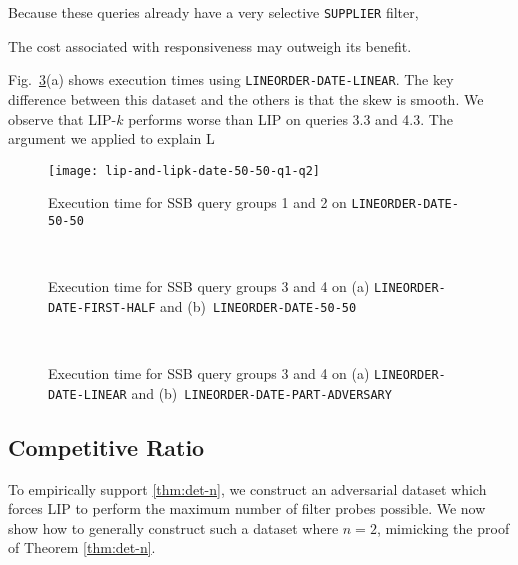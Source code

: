 Because these queries already have a very selective \texttt{SUPPLIER} filter, 

The cost associated with responsiveness may outweigh its benefit. 

Fig.~\ref{fig:times2}(a) shows execution times using \texttt{LINEORDER-DATE-LINEAR}. 
The key difference between this dataset and the others is that the skew is smooth. 
We observe that LIP-$k$ performs worse than LIP on queries 3.3 and 4.3. 
The argument we applied to explain L

\begin{figure}
    \centering
    \texttt{[image: lip-and-lipk-date-50-50-q1-q2]}
    \caption{Execution time for SSB query groups 1 and 2 on \texttt{LINEORDER-DATE-50-50}}
    \label{fig:times0}
\end{figure}

\begin{figure}
    \centering
    \\
    \caption{Execution time for SSB query groups 3 and 4 on (a) \texttt{LINEORDER-DATE-FIRST-HALF} and (b)~\texttt{LINEORDER-DATE-50-50}}
    \label{fig:times1}
\end{figure}


\begin{figure}
    \centering    
    \\
    \caption{Execution time for SSB query groups 3 and 4 on (a) \texttt{LINEORDER-DATE-LINEAR} and (b)~\texttt{LINEORDER-DATE-PART-ADVERSARY}}
    \label{fig:times2}
\end{figure}



\subsection{Competitive Ratio}
\label{sec:ratio}

To empirically support \ref{thm:det-n}, we construct an adversarial dataset which forces LIP to perform the maximum number of filter probes possible.
We now show how to generally construct such a dataset where $n = 2$, mimicking the proof of Theorem \ref{thm:det-n}.

